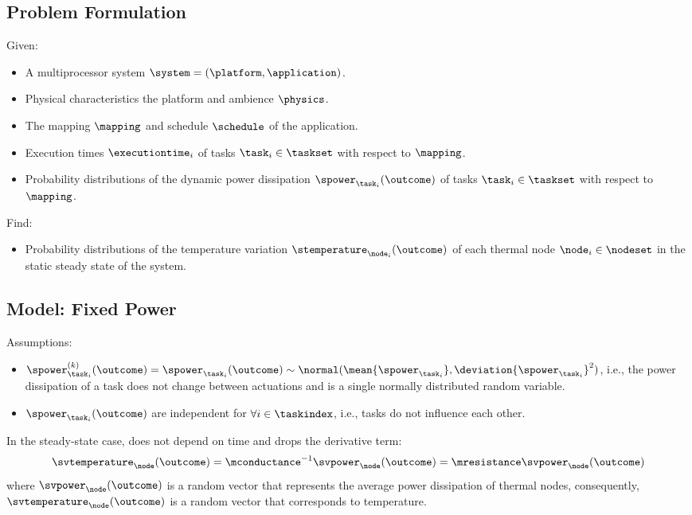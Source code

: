 \subsection{Problem Formulation}
Given:
\begin{itemize}
  \item A multiprocessor system $\system = (\platform, \application)$.
  \item Physical characteristics the platform and ambience $\physics$.
  \item The mapping $\mapping$ and schedule $\schedule$ of the application.
  \item Execution times $\executiontime_i$ of tasks $\task_i \in \taskset$ with respect to $\mapping$.
  \item Probability distributions of the dynamic power dissipation $\spower_{\task_i}(\outcome)$ of tasks $\task_i \in \taskset$ with respect to $\mapping$.
\end{itemize}

Find:
\begin{itemize}
  \item Probability distributions of the temperature variation $\stemperature_{\node_i}(\outcome)$ of each thermal node $\node_i \in \nodeset$ in the static steady state of the system.
\end{itemize}

\subsection{Model: Fixed Power} 
Assumptions:
\begin{itemize}
  \item $\spower^{(k)}_{\task_i}(\outcome) = \spower_{\task_i}(\outcome) \sim \normal(\mean{\spower_{\task_i}}, \deviation{\spower_{\task_i}}^2)$, i.e., the power dissipation of a task does not change between actuations and is a single normally distributed random variable.
  \item $\spower_{\task_i}(\outcome)$ are independent for $\forall i \in \taskindex$, i.e., tasks do not influence each other.
\end{itemize}

In the steady-state case,  does not depend on time and drops the derivative term:
\[
  \svtemperature_\node(\outcome) = \mconductance^{-1} \svpower_\node(\outcome) = \mresistance \svpower_\node(\outcome)
\]
where $\svpower_\node(\outcome)$ is a random vector that represents the average power dissipation of thermal nodes, consequently, $\svtemperature_\node(\outcome)$ is a random vector that corresponds to temperature.


